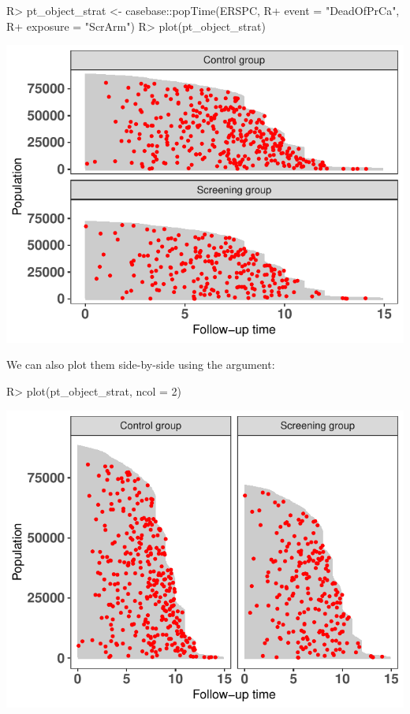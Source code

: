 \documentclass[
]{jss}
\begin{document}
\begin{CodeChunk}

\begin{CodeInput}
R> pt_object_strat <- casebase::popTime(ERSPC, 
R+                                      event = "DeadOfPrCa", 
R+                                      exposure = "ScrArm")
R> plot(pt_object_strat)
\end{CodeInput}


\begin{center}\includegraphics{../figures/plot-stratified-erspc-data-1} \end{center}

\end{CodeChunk}

We can also plot them side-by-side using the  argument:

\begin{CodeChunk}

\begin{CodeInput}
R> plot(pt_object_strat, ncol = 2)
\end{CodeInput}


\begin{center}\includegraphics{../figures/plot-stratified-erspc-data-side-1} \end{center}

\end{CodeChunk}
\end{document}
